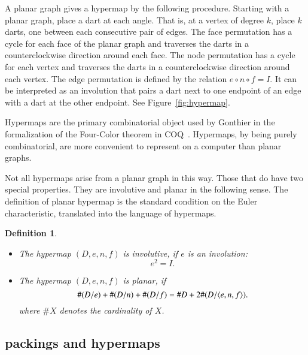\documentclass{article} %
\newtheorem{definition}[lemma]{Definition}
\begin{document}
A planar graph gives  a hypermap
by the following procedure.  Starting with a planar graph,
place a dart at each angle.  That is, at a vertex of degree $k$,
place $k$ darts, one between each consecutive pair of edges.
The face permutation has a cycle for
each face of the planar graph and  traverses the
darts in a counterclockwise direction around each face.
The node permutation has a cycle for each vertex and traverses
the darts in a counterclockwise direction around each vertex.
The edge permutation is defined by the relation $e\circ n\circ f=I$.
It can be interpreted as an involution that pairs a dart next
to one endpoint of an edge with a dart at the other endpoint.
See Figure~\ref{fig:hypermap}.

\begin{floatingfigure}{80mm}
  \begin{center}
   \end{center}
  \caption{}
\label{fig:hypermap}
\end{floatingfigure}

Hypermaps are the primary combinatorial object used by Gonthier
in the formalization of the Four-Color theorem in COQ~\cite{Gon}.
Hypermaps, by being purely combinatorial, are more convenient
to represent on a computer than planar graphs.  


Not all hypermaps arise from a planar graph in this way.
Those that do have two special properties.  They are involutive
and planar in the following sense.   The definition
of planar hypermap is the standard condition on the Euler
characteristic, translated into the language of hypermaps.

\begin{definition}\label{def:involutive}
\mbox{}
\begin{itemize}
\item The hypermap $(D,e,n,f)$ is involutive, if $e$ is an involution:
$$
 e^2 = I.
$$
\item The hypermap $(D,e,n,f)$ is planar, if
   $$
   \#(D/e) + \#(D/n) + \#(D/f) = \# D + 2\#(D/\langle e,n,f\rangle).
   $$
where $\# X$ denotes the cardinality of $X$.
\end{itemize}
\end{definition}

\subsection{packings and hypermaps}\label{sec:ph}
\end{document}
